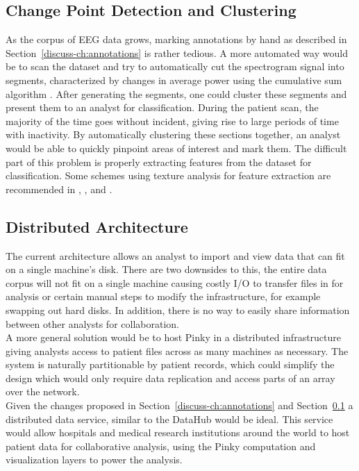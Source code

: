 \subsection{Change Point Detection and Clustering}\label{discuss-ch:cpd}

As the corpus of EEG data grows, marking annotations by hand as described in
Section~\ref{discuss-ch:annotations} is rather tedious.  A more automated way
would be to scan the dataset and try to automatically cut the spectrogram signal
into segments, characterized by changes in average power using the cumulative
sum algorithm \cite{cumsum}. After generating the segments, one could cluster these
segments and present them to an analyst for classification. During the patient
scan, the majority of the time goes without incident, giving rise to large
periods of time with inactivity. By automatically clustering these sections
together, an analyst would be able to quickly pinpoint areas of interest and
mark them. The difficult part of this problem is properly extracting features
from the dataset for classification. Some schemes using texture analysis for
feature extraction are recommended in \cite{texture-classification1},
\cite{texture-classification2}, and \cite{auto-segment}. \\

\subsection{Distributed Architecture}\label{discuss-ch:dist-arch}

The current architecture allows an analyst to import and view data that can fit
on a single machine's disk. There are two downsides to this, the entire data
corpus will not fit on a single machine causing costly I/O to
transfer files in for analysis or certain manual steps to modify the
infrastructure, for example swapping out hard disks. In addition, there is no
way to easily share information between other analysts for collaboration. \\

A more general solution would be to host Pinky in a distributed infrastructure
giving analysts access to patient files across as many machines as necessary.
The system is naturally partitionable by patient records, which could simplify
the design which would only require data replication and access parts of
an array over the network. \\

Given the changes proposed in Section~\ref{discuss-ch:annotations} and
Section~\ref{discuss-ch:cpd} a distributed data service, similar to the
DataHub\cite{datahub} would be ideal.  This service would allow hospitals and
medical research institutions around the world to host patient data for
collaborative analysis, using the Pinky computation and visualization layers to
power the analysis.

